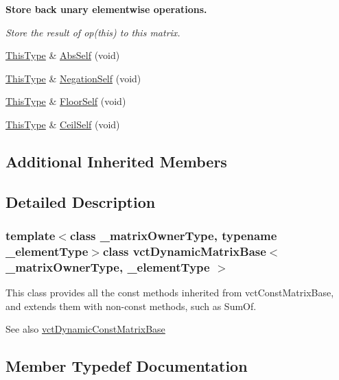 \begin{Indent}{\bf Store back unary elementwise operations.}\par
{\em Store the result of op(this) to this matrix. }\begin{DoxyCompactItemize}
\item 
\hyperlink{classvct_dynamic_const_matrix_base_ac4ff48cbe4d9de3fdef5a02447ffb9db}{This\+Type} \& \hyperlink{classvct_dynamic_matrix_base_a36435390c3cd0ff8393b9a15991850cd}{Abs\+Self} (void)
\item 
\hyperlink{classvct_dynamic_const_matrix_base_ac4ff48cbe4d9de3fdef5a02447ffb9db}{This\+Type} \& \hyperlink{classvct_dynamic_matrix_base_a699f8b9711f810fbdfdde1b164055696}{Negation\+Self} (void)
\item 
\hyperlink{classvct_dynamic_const_matrix_base_ac4ff48cbe4d9de3fdef5a02447ffb9db}{This\+Type} \& \hyperlink{classvct_dynamic_matrix_base_a32885a796792112d8aadaf5a787c871d}{Floor\+Self} (void)
\item 
\hyperlink{classvct_dynamic_const_matrix_base_ac4ff48cbe4d9de3fdef5a02447ffb9db}{This\+Type} \& \hyperlink{classvct_dynamic_matrix_base_a6f2c0c413c6d3bb2d3b5f19c9f6a1c4c}{Ceil\+Self} (void)
\end{DoxyCompactItemize}
\end{Indent}
\subsection*{Additional Inherited Members}


\subsection{Detailed Description}
\subsubsection*{template$<$class \+\_\+matrix\+Owner\+Type, typename \+\_\+element\+Type$>$class vct\+Dynamic\+Matrix\+Base$<$ \+\_\+matrix\+Owner\+Type, \+\_\+element\+Type $>$}

This class provides all the const methods inherited from vct\+Const\+Matrix\+Base, and extends them with non-\/const methods, such as Sum\+Of.

\begin{DoxySeeAlso}{See also}
\hyperlink{classvct_dynamic_const_matrix_base}{vct\+Dynamic\+Const\+Matrix\+Base} 
\end{DoxySeeAlso}


\subsection{Member Typedef Documentation}
\hypertarget{classvct_dynamic_matrix_base_a6285355f814f82089376c6819d127fd4}{}
